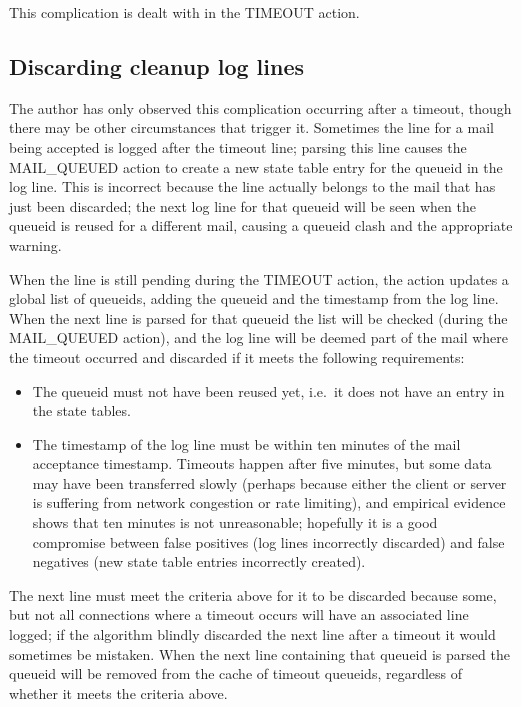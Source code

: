 This complication is dealt with in the TIMEOUT action.

\subsection{Discarding cleanup log lines}

\label{discarding cleanup log lines}

The author has only observed this complication occurring after a timeout,
though there may be other circumstances that trigger it.  Sometimes the
 line for a mail being accepted is logged after the timeout
line; parsing this line causes the MAIL\_QUEUED action to create a new
state table entry for the queueid in the log line.  This is incorrect
because the line actually belongs to the mail that has just been discarded;
the next log line for that queueid will be seen when the queueid is reused
for a different mail, causing a queueid clash and the appropriate warning.

When the  line is still pending during the TIMEOUT action,
the action updates a global list of queueids, adding the queueid and the
timestamp from the log line.  When the next  line is parsed
for that queueid the list will be checked (during the MAIL\_QUEUED action),
and the log line will be deemed part of the mail where the timeout occurred
and discarded if it meets the following requirements:

\begin{itemize}

    \item The queueid must not have been reused yet, i.e.\ it does not have
        an entry in the state tables.

    \item The timestamp of the  log line must be within ten
        minutes of the mail acceptance timestamp.  Timeouts happen after
        five minutes, but some data may have been transferred slowly
        (perhaps because either the client or server is suffering from
        network congestion or rate limiting), and empirical evidence shows
        that ten minutes is not unreasonable; hopefully it is a good
        compromise between false positives (log lines incorrectly
        discarded) and false negatives (new state table entries incorrectly
        created).

\end{itemize}

The next  line must meet the criteria above for it to be
discarded because some, but not all connections where a timeout occurs will
have an associated  line logged; if the algorithm blindly
discarded the next  line after a timeout it would sometimes
be mistaken.  When the next  line containing that queueid is
parsed the queueid will be removed from the cache of timeout queueids,
regardless of whether it meets the criteria above.

